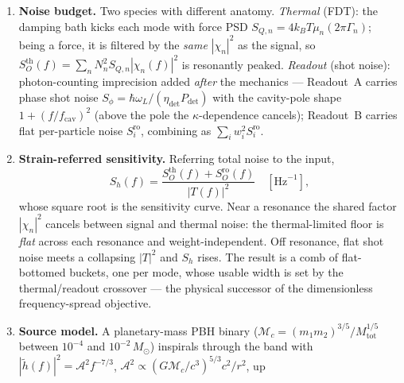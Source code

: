 \documentclass[11pt, letterpaper]{article}
\begin{document}
\begin{enumerate}[noitemsep]
\begin{equation}
          T(f) = \sum_n N_n B_n \chi_n(f) \quad [\mathrm{m/strain}]:
        \end{equation}
        the wave drives mode $n$ with strength $B_n$, the mode amplifies
        by $\chi_n$, the readout listens with gain $N_n$.  Readout~A
        fixes $\mathbf{w} = \mathbf{g}/|\mathbf{g}|$ in hardware;
        Readout~B leaves $\mathbf{w}$ free (Table~\ref{tab:readouts}).
  \item \textbf{Noise budget.}  Two species with different anatomy.
        \emph{Thermal} (FDT): the damping bath kicks each mode with
        force PSD $S_{Q,n} = 4 k_B T \mu_n (2\pi\Gamma_n)$; being a
        force, it is filtered by the \emph{same} $|\chi_n|^2$ as the
        signal, so $S_O^{\mathrm{th}}(f) = \sum_n N_n^2 S_{Q,n}
        |\chi_n(f)|^2$ is resonantly peaked.  \emph{Readout} (shot
        noise): photon-counting imprecision added \emph{after} the
        mechanics --- Readout~A carries phase shot noise
        $S_\phi = \hbar\omega_L/(\eta_{\det} P_{\det})$ with the
        cavity-pole shape $1 + (f/f_{\mathrm{cav}})^2$ (above the pole
        the $\kappa$-dependence cancels); Readout~B carries flat
        per-particle noise $S_i^{\mathrm{ro}}$, combining as
        $\sum_i w_i^2 S_i^{\mathrm{ro}}$.
  \item \textbf{Strain-referred sensitivity.}  Referring total noise to
        the input,
        \begin{equation}
          S_h(f) = \frac{S_O^{\mathrm{th}}(f) + S_O^{\mathrm{ro}}(f)}
                        {|T(f)|^2} \quad [\mathrm{Hz}^{-1}],
        \end{equation}
        whose square root is the sensitivity curve.  Near a resonance
        the shared factor $|\chi_n|^2$ cancels between signal and
        thermal noise: the thermal-limited floor is \emph{flat} across
        each resonance and weight-independent.  Off resonance, flat
        shot noise meets a collapsing $|T|^2$ and $S_h$ rises.  The
        result is a comb of flat-bottomed buckets, one per mode, whose
        usable width is set by the thermal/readout crossover --- the
        physical successor of the dimensionless frequency-spread
        objective.
  \item \textbf{Source model.}  A planetary-mass PBH binary
        ($\mathcal{M}_c = (m_1 m_2)^{3/5}/M_{\mathrm{tot}}^{1/5}$
        between $10^{-4}$ and $10^{-2}\,M_\odot$) inspirals through the
        band with $|\tilde h(f)|^2 = \mathcal{A}^2 f^{-7/3}$,
        $\mathcal{A}^2 \propto (G\mathcal{M}_c/c^3)^{5/3} c^2/r^2$, up

\end{enumerate}
\end{document}
